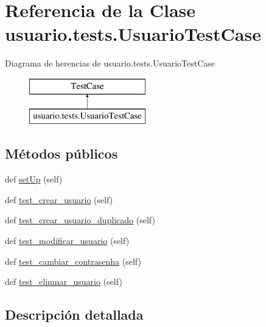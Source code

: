 \hypertarget{classusuario_1_1tests_1_1_usuario_test_case}{}\section{Referencia de la Clase usuario.\+tests.\+Usuario\+Test\+Case}
\label{classusuario_1_1tests_1_1_usuario_test_case}
Diagrama de herencias de usuario.\+tests.\+Usuario\+Test\+Case\begin{figure}[H]
\begin{center}
\leavevmode
\includegraphics[height=2.000000cm]{classusuario_1_1tests_1_1_usuario_test_case}
\end{center}
\end{figure}
\subsection*{Métodos públicos}
\begin{DoxyCompactItemize}
\item 
def \hyperlink{classusuario_1_1tests_1_1_usuario_test_case_ac9492b9c18f5f3cbd7171a1ecf741fd6}{set\+Up} (self)
\item 
def \hyperlink{classusuario_1_1tests_1_1_usuario_test_case_a0b985725a09142ae7a74c538abfd12a8}{test\+\_\+crear\+\_\+usuario} (self)
\item 
def \hyperlink{classusuario_1_1tests_1_1_usuario_test_case_a7f5d911606c90257818050d1973d8ed9}{test\+\_\+crear\+\_\+usuario\+\_\+duplicado} (self)
\item 
def \hyperlink{classusuario_1_1tests_1_1_usuario_test_case_a8cab65d04d4a62afbc9e2afb768ce978}{test\+\_\+modificar\+\_\+usuario} (self)
\item 
def \hyperlink{classusuario_1_1tests_1_1_usuario_test_case_a1c6c872b668e729accdc14a78b4acabd}{test\+\_\+cambiar\+\_\+contrasenha} (self)
\item 
def \hyperlink{classusuario_1_1tests_1_1_usuario_test_case_aa8e47d4bcfebd96cd2f5afa7de0ecd18}{test\+\_\+elimnar\+\_\+usuario} (self)
\end{DoxyCompactItemize}


\subsection{Descripción detallada}


